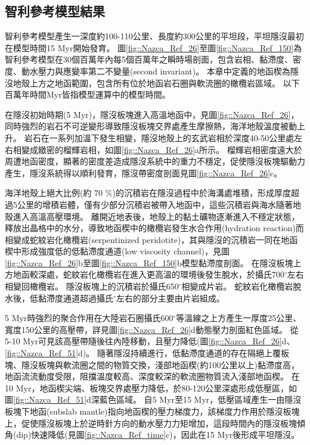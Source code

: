 \subsection{智利參考模型結果}\label{智利參考模型結果}
智利參考模型產生一深度約100-110公里、長度約300公里的平坦段，平坦隱沒最初在模型時間15 Myr開始發育。
圖\ref{fig::Nazca_Ref_26}至圖\ref{fig::Nazca_Ref_150}為智利參考模型在30個百萬年內每5個百萬年之瞬時場剖面，包含岩相、黏滯度、密度、動水壓力與應變率第二不變量(second invariant)。
本章中定義的地函楔為隱沒地殼上方之地函範圍，包含所有位於地函岩石圈與軟流圈的橄欖岩區域。
以下百萬年時間Myr皆指模型運算中的模型時間。

在隱沒初始時期(5 Myr)，隱沒板塊進入高溫地函中，見圖\ref{fig::Nazca_Ref_26}，同時強烈的岩石不可逆變形導致隱沒板塊交界處產生摩擦熱，海洋地殼溫度被動上升。
岩石在一系列加溫下發生相變，隱沒地殼上的玄武岩相於深度40-50公里處左右相變成緻密的榴輝岩相，如圖\ref{fig::Nazca_Ref_26}a所示。
榴輝岩相密度遠大於周遭地函密度，顯著的密度差造成隱沒系統中的重力不穩定，促使隱沒板塊驅動力產生，隱沒系統得以順利發育，隱沒帶密度剖面見圖\ref{fig::Nazca_Ref_26}c。

海洋地殼上絕大比例(約 70 $\%$)的沉積岩在隱沒過程中於海溝處堆積，形成厚度超過5公里的增積岩體，僅有少部分沉積岩被帶入地函中，這些沉積岩與海水隨著地殼進入高溫高壓環境。
離開近地表後，地殼上的黏土礦物逐漸進入不穩定狀態，釋放出晶格中的水分，導致地函楔中的橄欖岩發生水合作用(hydration reaction)而相變成蛇紋岩化橄欖岩(serpentinized peridotite)，其與隱沒的沉積岩一同在地函楔中形成強度低的低黏滯度通道(low viscosity channel)，見圖\ref{fig::Nazca_Ref_26}b至圖\ref{fig::Nazca_Ref_150}b模型黏滯度剖面。
在隱沒板塊上方地函較深處，蛇紋岩化橄欖岩在進入更高溫的環境後發生脫水，於攝氏700$^{\circ}$左右相變回橄欖岩。
隱沒板塊上的沉積岩於攝氏650$^{\circ}$相變成片岩。
蛇紋岩化橄欖岩脫水後，低黏滯度通道超過攝氏$^{\circ}$左右的部分主要由片岩組成。

5 Myr時強烈的聚合作用在大陸岩石圈攝氏600$^{\circ}$等溫線之上方產生一厚度25公里、寬度150公里的高壓帶，詳見圖\ref{fig::Nazca_Ref_26}d動態壓力剖面紅色區域。
從5-10 Myr可見該高壓帶隨後往內陸移動，且壓力降低(圖\ref{fig::Nazca_Ref_26}d、\ref{fig::Nazca_Ref_51}d)。
隨著隱沒持續進行，低黏滯度通道的存在隔絕上覆板塊、隱沒板塊與軟流圈之間的物質交換，淺部地函楔(約100公里以上)黏滯度高，地函流流動度受限，阻擋溫度較高、深度較深的軟流圈物質流入淺部地函楔。
在10 Myr，地函楔尖端、板塊交界處壓力降低，於80-120公里深處形成低壓區，如圖\ref{fig::Nazca_Ref_51}d深藍色區域。 
自5 Myr至15 Myr，低壓區域產生一由隱沒板塊下地函(subslab mantle)指向地函楔的壓力梯度力，該梯度力作用於隱沒板塊上，促使隱沒板塊上於逆時針方向的動水壓力力矩增加，這段時間內的隱沒板塊傾角(dip)快速降低(見圖\ref{fig::Nazca_Ref_time}c)，因此在15 Myr後形成平坦隱沒。


